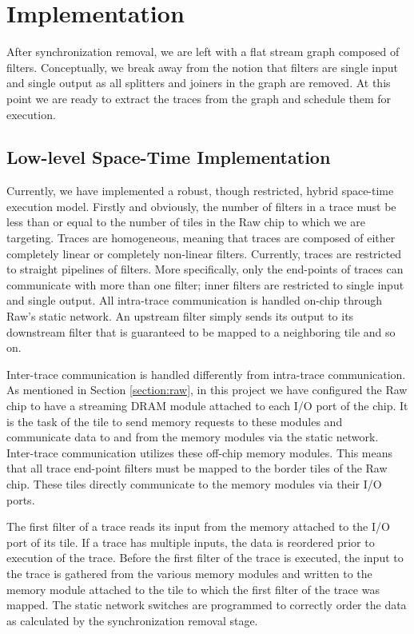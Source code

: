\section{Implementation}
\label{sec:implementation}
After synchronization removal, we are left with a flat stream graph
composed of filters.  Conceptually, we break away from the notion that
filters are single input and single output as all splitters and
joiners in the graph are removed.  At this point we are ready to
extract the traces from the graph and schedule them for execution.  


\subsection{Low-level Space-Time Implementation}
Currently, we have implemented a robust, though restricted, hybrid
space-time execution model.  Firstly and obviously, the number of
filters in a trace must be less than or equal to the number of tiles
in the Raw chip to which we are targeting.  Traces are homogeneous,
meaning that traces are composed of either completely linear or
completely non-linear filters.  Currently, traces are restricted to
straight pipelines of filters.  More specifically, only the end-points
of traces can communicate with more than one filter; inner filters are
restricted to single input and single output.  All intra-trace
communication is handled on-chip through Raw's static network.  An
upstream filter simply sends its output to its downstream filter that
is guaranteed to be mapped to a neighboring tile and so on.

Inter-trace communication is handled differently from intra-trace
communication.  As mentioned in Section \ref{section:raw}, in this
project we have configured the Raw chip to have a streaming DRAM
module attached to each I/O port of the chip.  It is the task of the
tile to send memory requests to these modules and communicate data to
and from the memory modules via the static network.  Inter-trace
communication utilizes these off-chip memory modules.  This means that
all trace end-point filters must be mapped to the border tiles of the
Raw chip.  These tiles directly communicate to the memory modules via
their I/O ports.  

The first filter of a trace reads its input from the memory attached
to the I/O port of its tile.  If a trace has multiple inputs, the data
is reordered prior to execution of the trace.  Before the first filter
of the trace is executed, the input to the trace is gathered from the
various memory modules and written to the memory module attached to
the tile to which the first filter of the trace was mapped.  The
static network switches are programmed to correctly order the data as
calculated by the synchronization removal stage.

